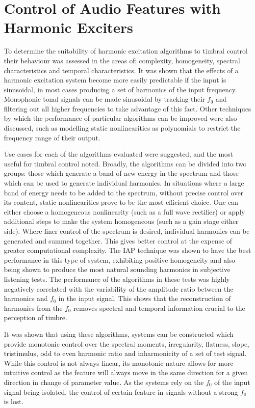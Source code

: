 \section{Control of Audio Features with Harmonic Exciters}
\label{sec:Conclusion-FeatureConrol}
	To determine the suitability of harmonic excitation algorithms to timbral control their behaviour was assessed in
	the areas of: complexity, homogeneity, spectral characteristics and temporal characteristics. It was shown that the
	effects of a harmonic excitation system become more easily predictable if the input is sinusoidal, in most cases
	producing a set of harmonics of the input frequency. Monophonic tonal signals can be made sinusoidal by tracking
	their $f_{0}$ and filtering out all higher frequencies to take advantage of this fact. Other techniques by which the
	performance of particular algorithms can be improved were also discussed, such as modelling static nonlinearities as
	polynomials to restrict the frequency range of their output.
	
	Use cases for each of the algorithms evaluated were suggested, and the most useful for timbral control noted.
	Broadly, the algorithms can be divided into two groups: those which generate a band of new energy in the spectrum
	and those which can be used to generate individual harmonics. In situations where a large band of energy needs to be
	added to the spectrum, without precise control over its content, static nonlinearities prove to be the most
	efficient choice. One can either choose a homogeneous nonlinearity (such as a full wave rectifier) or apply
	additional steps to make the system homogeneous (such as a gain stage either side). Where finer control of the
	spectrum is desired, individual harmonics can be generated and summed together. This gives better control at the
	expense of greater computational complexity. The IAP technique was shown to have the best performance in this type
	of system, exhibiting positive homogeneity and also being shown to produce the most natural sounding harmonics in
	subjective listening tests. The performance of the algorithms in these tests was highly negatively correlated with
	the variability of the amplitude ratio between the harmonics and $f_{0}$ in the input signal. This shows that the
	reconstruction of harmonics from the $f_{0}$ removes spectral and temporal information crucial to the perception of
	timbre.

	It was shown that using these algorithms, systems can be constructed which provide monotonic control over the
	spectral moments, irregularity, flatness, slope, tristimulus, odd to even harmonic ratio and inharmonicity of a set
	of test signal. While this control is not always linear, its monotonic nature allows for more intuitive control as
	the feature will always move in the same direction for a given direction in change of parameter value. As the
	systems rely on the $f_{0}$ of the input signal being isolated, the control of certain feature in signals without a
	strong $f_{0}$ is lost. 

